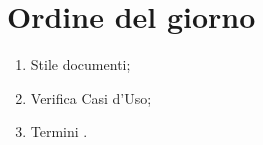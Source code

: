 \documentclass[../verbale-2017-01-05.tex]{subfiles}
\begin{document}
	
\section{Ordine del giorno}
	\begin{enumerate}

		\item Stile documenti;
		\item Verifica Casi d'Uso;
		\item Termini \glossario.
	\end{enumerate}
	
\end{document}
